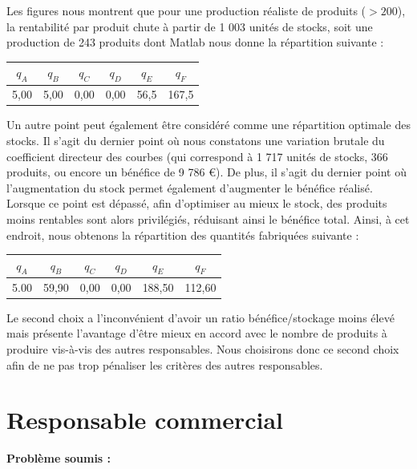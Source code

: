 \documentclass[paper=a4, fontsize=11pt]{report}
\numberwithin{equation}{section}		%
\numberwithin{figure}{section}			%
\numberwithin{table}{section}				%
\renewcommand{\bf}[1]{\textbf{#1}}
\begin{document}
Les figures nous montrent que pour une production réaliste de produits ($> 200$), la rentabilité par produit chute à partir de 1 003 unités de stocks, soit une production de 243 produits dont Matlab nous donne la répartition suivante :

\begin{center}
\begin{tabular}{cccccc}
\hline 
$q_A$ & $q_B$ & $q_C$ & $q_D$ & $q_E$ & $q_F$ \\ 
\hline 
5,00 & 5,00 & 0,00 & 0,00 & 56,5 & 167,5 \\ 
\hline 
\end{tabular} 
\end{center}

Un autre point peut également être considéré comme une répartition optimale des stocks. Il s'agit du dernier point où nous constatons une variation brutale du coefficient directeur des courbes (qui correspond à 1 717 unités de stocks, 366 produits, ou encore un bénéfice de 9 786 €). De plus, il s'agit du dernier point où l'augmentation du stock permet également d'augmenter le bénéfice réalisé. Lorsque ce point est dépassé, afin d'optimiser au mieux le stock, des produits moins rentables sont alors privilégiés, réduisant ainsi le bénéfice total. Ainsi, à cet endroit, nous obtenons la répartition des quantités fabriquées suivante :

\begin{center}
\begin{tabular}{cccccc}
\hline 
$q_A$ & $q_B$ & $q_C$ & $q_D$ & $q_E$ & $q_F$ \\ 
\hline 
5.00 & 59,90 & 0,00 & 0,00 & 188,50 & 112,60 \\ 
\hline 
\end{tabular} 
\end{center}

Le second choix a l'inconvénient d'avoir un ratio bénéfice/stockage moins élevé mais présente l'avantage d'être mieux en accord avec le nombre de produits à produire vis-à-vis des autres responsables. Nous choisirons donc ce second choix afin de ne pas trop pénaliser les critères des autres responsables.

\section{Responsable commercial}
\bf{Problème soumis :}
\end{document}
